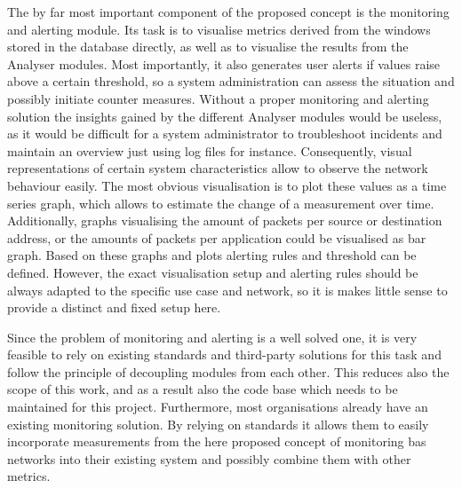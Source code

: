 The by far most important component of the proposed concept is the monitoring and alerting module.
Its task is to visualise metrics derived from the windows stored in the database directly, as well as to visualise the results from the Analyser modules.
Most importantly, it also generates user alerts if values raise above a certain threshold, so a system administration can assess the situation and possibly initiate counter measures.
Without a proper monitoring and alerting solution the insights gained by the different Analyser modules would be useless, as it would be difficult for a system administrator to troubleshoot incidents and maintain an overview just using log files for instance.
Consequently, visual representations of certain system characteristics allow to observe the network behaviour easily.
The most obvious visualisation is to plot these values as a time series graph, which allows to estimate the change of a measurement over time.
Additionally, graphs visualising the amount of packets per source or destination address, or the amounts of packets per application could be visualised as bar graph.
Based on these graphs and plots alerting rules and threshold can be defined.
However, the exact visualisation setup and alerting rules should be always adapted to the specific use case and network, so it is makes little sense to provide a distinct and fixed setup here.

Since the problem of monitoring and alerting is a well solved one, it is very feasible to rely on existing standards and third-party solutions for this task and follow the principle of decoupling modules from each other.
This reduces also the scope of this work, and as a result also the code base which needs to be maintained for this project.
Furthermore, most organisations already have an existing monitoring solution. By relying on standards it allows them to easily incorporate measurements from the here proposed concept of monitoring \gls{bas} networks into their existing system and possibly combine them with other metrics.

